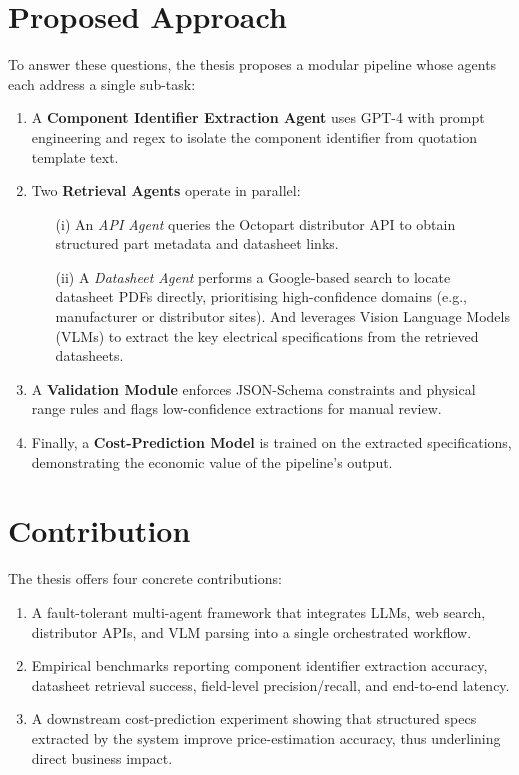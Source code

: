 \section{Proposed Approach }
To answer these questions, the thesis proposes a modular pipeline whose agents each address a single sub-task:  
\begin{enumerate}
  \item A \textbf{Component Identifier Extraction Agent} uses GPT-4 with prompt engineering and regex to isolate the component identifier from quotation template text.  
  \item Two \textbf{Retrieval Agents} operate in parallel:
    \begin{itemize}
      \item[(i)] An \emph{API Agent} queries the Octopart distributor API to obtain structured part metadata and datasheet links.
      \item[(ii)] A \emph{Datasheet Agent} performs a Google-based search to locate datasheet PDFs directly, prioritising high-confidence domains (e.g., manufacturer or distributor sites). And leverages Vision Language Models (VLMs) to extract the key electrical specifications from the retrieved datasheets.
    \end{itemize}
  \item A \textbf{Validation Module} enforces JSON-Schema constraints and physical range rules and flags low-confidence extractions for manual review.  
  \item Finally, a \textbf{Cost-Prediction Model} is trained on the extracted specifications, demonstrating the economic value of the pipeline's output.
\end{enumerate}

\section{Contribution }
The thesis offers four concrete contributions:
\begin{enumerate}
  \item A fault-tolerant multi-agent framework that integrates LLMs, web search, distributor APIs, and VLM parsing into a single orchestrated workflow.  
  \item Empirical benchmarks reporting component identifier extraction accuracy, datasheet retrieval success, field-level precision/recall, and end-to-end latency.  
  \item A downstream cost-prediction experiment showing that structured specs extracted by the system improve price-estimation accuracy, thus underlining direct business impact.
\end{enumerate}

